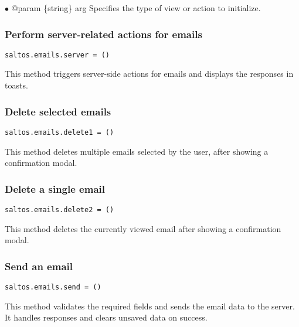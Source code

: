 \documentclass[a4paper]{article}
\begin{document}
\begin{compactitem}
\item[\color{myblue}$\bullet$] @param \{string\} arg Specifies the type of view or action to initialize.
\end{compactitem}

\hypertarget{toc56}{}
\subsubsection{Perform server-related actions for emails}

\begin{lstlisting}
saltos.emails.server = ()
\end{lstlisting}

This method triggers server-side actions for emails and displays the responses in toasts.

\hypertarget{toc57}{}
\subsubsection{Delete selected emails}

\begin{lstlisting}
saltos.emails.delete1 = ()
\end{lstlisting}

This method deletes multiple emails selected by the user, after showing a confirmation modal.

\hypertarget{toc58}{}
\subsubsection{Delete a single email}

\begin{lstlisting}
saltos.emails.delete2 = ()
\end{lstlisting}

This method deletes the currently viewed email after showing a confirmation modal.

\hypertarget{toc59}{}
\subsubsection{Send an email}

\begin{lstlisting}
saltos.emails.send = ()
\end{lstlisting}

This method validates the required fields and sends the email data to the server.
It handles responses and clears unsaved data on success.
\end{document}
